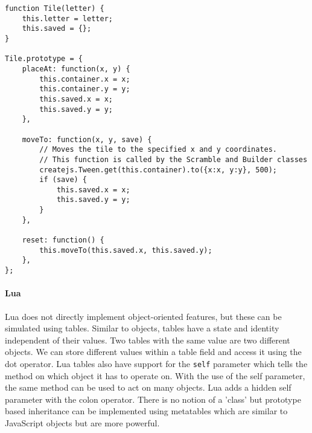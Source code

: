 \begin{lstlisting}[caption=A class definition in JavaScript]
function Tile(letter) {
	this.letter = letter;
	this.saved = {};
}

Tile.prototype = {
	placeAt: function(x, y) {
		this.container.x = x;
		this.container.y = y;
		this.saved.x = x;
		this.saved.y = y;
	},

	moveTo: function(x, y, save) {
		// Moves the tile to the specified x and y coordinates.
		// This function is called by the Scramble and Builder classes
		createjs.Tween.get(this.container).to({x:x, y:y}, 500);
		if (save) {
			this.saved.x = x;
			this.saved.y = y;
		}
	},

	reset: function() {
		this.moveTo(this.saved.x, this.saved.y);
	},
};
\end{lstlisting}

\paragraph{Lua}
Lua does not directly implement object-oriented features, but these can be simulated using tables. Similar to objects, tables have a state and identity independent of their values. Two tables with the same value are two different objects. We can store different values within a table field and access it using the dot operator. Lua tables also have support for the \texttt{self} parameter which tells the method on which object it has to operate on. With the use of the self parameter, the same method can be used to act on many objects. Lua adds a hidden self parameter with the colon operator. There is no notion of a 'class' but prototype based inheritance can be implemented using metatables which are similar to JavaScript objects but are more powerful. 
